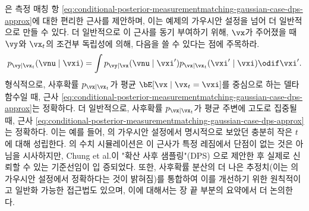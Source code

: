 \documentclass[../../book-main_ko.tex]{subfiles}
\begin{document}
\begin{example}
은 측정 매칭 항 \eqref{eq:conditional-posterior-measurementmatching-gaussian-case-dps-approx}에 대한 편리한 근사를 제안하며, 이는 예제의 가우시안 설정을 넘어 더 일반적으로 만들 수 있다. 더 일반적으로 이 근사를 동기 부여하기 위해, $\vx$가 주어졌을 때 $\vy$와 $\vx_t$의 조건부 독립성에 의해, 다음을 쓸 수 있다는 점에 주목하라.
\begin{equation}
  p_{\vy \mid \vx_t}(\vnu \mid \vxi)
  = 
  \int p_{\vy \mid \vx}(\vnu \mid \vxi') p_{\vx \mid \vx_t}(\vxi' \mid \vxi)
  \odif  \vxi'.
\end{equation}
형식적으로, 사후확률 $p_{\vx\mid \vx_t}$가 평균 $\bE[\vx \mid \vx_t=\vxi]$를 중심으로 하는 델타 함수일 때, 근사 \eqref{eq:conditional-posterior-measurementmatching-gaussian-case-dps-approx}는 정확하다. 더 일반적으로, 사후확률 $p_{\vx \mid \vx_t}$가 평균 주변에 고도로 집중될 때, 근사 \eqref{eq:conditional-posterior-measurementmatching-gaussian-case-dps-approx}는 정확하다. 이는 예를 들어, 의 가우시안 설정에서 명시적으로 보았던 충분히 작은 $t$에 대해 성립한다.
의 수치 시뮬레이션은 이 근사가 특정 레짐에서 단점이 없는 것은 아님을 시사하지만, Chung et al.이 "확산 사후 샘플링"(DPS) \cite{chung2023diffusion}으로 제안한 후 실제로 신뢰할 수 있는 기준선임이 입 증되었다.
또한, 사후확률 분산의 더 나은 추정치(이는 의 가우시안 설정에서 정확하다는 것이 밝혀짐)를 통합하여 이를 개선하기 위한 원칙적이고 일반화 가능한 접근법도 있으며, 이에 대해서는 장 끝 부분의 요약에서 더 논의한 다.
\end{example}
\end{document}
